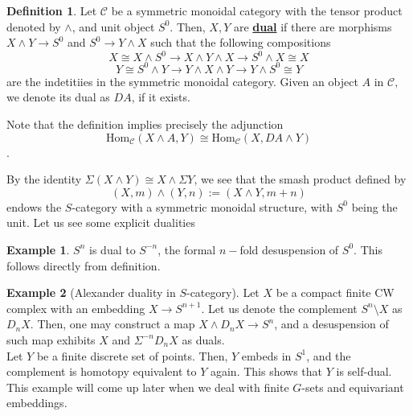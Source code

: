 \documentclass{article}
\theoremstyle{definition}
\theoremstyle{definition}
\newtheorem{definition}{Definition}[theorem]
\theoremstyle{definition}
\theoremstyle{definition}
\theoremstyle{definition}
\theoremstyle{definition}
\theoremstyle{definition}
\newtheorem{example}{Example}[theorem]
\begin{document}
\begin{tcolorbox}[colback=purple!5!white,colframe=purple!75!black]
\begin{definition}
Let $\mathcal{C}$ be a symmetric monoidal category with the tensor product denoted by $\wedge$, and unit object $S^0$. Then, $X,Y$ are \underline{\textbf{dual}} if there are morphisms $X\wedge Y\to S^0$ and $S^0\to Y\wedge X$ such that the following compositions
\[X\cong X\wedge S^0\to X\wedge Y\wedge X\to S^0\wedge X\cong X\]
\[Y\cong S^0\wedge Y\to Y\wedge X\wedge Y\to Y\wedge S^0\cong Y\]
are the indetitiies in the symmetric monoidal category. Given an object $A$ in $\mathcal{C},$ we denote its dual as $DA$, if it exists.
\end{definition}
\end{tcolorbox}
Note that the definition implies precisely the adjunction 
\[\textrm{Hom}_{\mathcal{C}}(X\wedge A, Y)\cong \textrm{Hom}_{\mathcal{C}}(X, DA\wedge Y)\]. 



By the identity $\Sigma(X\wedge Y)\cong X\wedge \Sigma Y$, we see that the smash product defined by 
\[(X,m)\wedge (Y,n):=(X\wedge Y,m+n)\]
endows the $S$-category with a symmetric monoidal structure, with $S^0$ being the unit. Let us see some explicit dualities

\begin{tcolorbox}[colback=yellow!5!white,colframe=yellow!30!white]
\begin{example}
    $S^n$ is dual to $S^{-n}$, the formal $n-$fold desuspension of $S^0$. This follows directly from definition.
\end{example}
\end{tcolorbox}

\begin{tcolorbox}[colback=yellow!5!white,colframe=yellow!30!white]
    \begin{example}[Alexander duality in $S$-category]
   Let $X$ be a compact finite CW complex with an embedding $X\to S^{n+1}$. Let us denote the complement $S^n\setminus X$ as $D_nX$. Then, one may construct a map $X\wedge D_nX\to S^n$, and a desuspension of such map exhibits $X$ and $\Sigma^{-n}D_nX$ as duals. \\

   Let $Y$ be a finite discrete set of points. Then, $Y$ embeds in $S^1$, and the complement is homotopy equivalent to $Y$ again. This shows that $Y$ is self-dual. This example will come up later when we deal with finite $G$-sets and equivariant embeddings. 
    \end{example}
    \end{tcolorbox}
\end{document}
